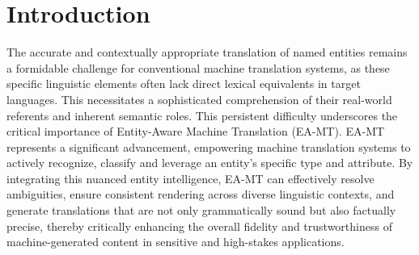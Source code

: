 \documentclass{ecai}
\begin{document}
\section{Introduction}
\label{sec:intro}
The accurate and contextually appropriate translation of named entities remains a formidable challenge
for conventional machine translation systems, as these specific linguistic elements often lack direct
lexical equivalents in target languages. This necessitates a sophisticated comprehension of their real-world
referents and inherent semantic roles. This persistent difficulty underscores the critical importance of Entity-Aware
Machine Translation (EA-MT). EA-MT represents a significant advancement, empowering machine translation systems to actively
recognize, classify and leverage an entity's specific type and attribute. By integrating this nuanced entity intelligence, 
EA-MT can effectively resolve ambiguities, ensure consistent rendering across diverse linguistic contexts, 
and generate translations that are not only grammatically sound but also factually precise, 
thereby critically enhancing the overall fidelity and trustworthiness of machine-generated content
 in sensitive and high-stakes applications.

\end{document}
